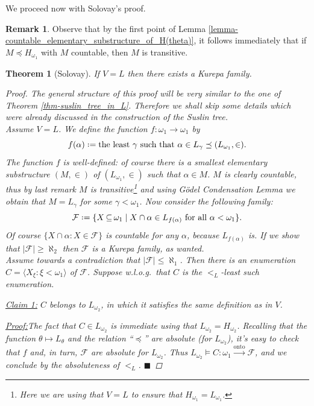 \documentclass[11pt,a4paper]{report}
\newtheorem{theorem}{Theorem}[chapter] %
\theoremstyle{definition}
\newtheorem*{remark}{Remark}
\theoremstyle{num.custom-title}
\theoremstyle{custom-title}
\newenvironment{claim}[1]{\par\noindent\underline{Claim#1:}\space}{} %
\newenvironment{claimproof}[1]{\par\noindent\underline{Proof:}\space#1}{\leavevmode\unskip\penalty9999 \hbox{}\nobreak\hfill\quad\hbox{$\blacksquare$}} %
\DeclareMathOperator{\sse}{\subseteq}
\newcommand{\F}{\mathcal{F}}
\newcommand{\onto}{\xrightarrow{\text{onto}}}
\newcommand*{\defeq}{\mathrel{\rlap{%
                     \raisebox{0.3ex}{$\cdot$}}%
                     \raisebox{-0.3ex}{$\cdot$}}%
                     =}
\begin{document}
We proceed now with Solovay's proof.

\begin{remark}
Observe that by the first point of Lemma \ref{lemma-countable_elementary_substructure_of_H(theta)}, it follows immediately that if $M \preceq H_{\omega_1}$ with $M$ countable, then $M$ is transitive.
\end{remark}

\begin{theorem}[Solovay]\label{thm-kurepa_family_in_L}
If $V=L$ then there exists a Kurepa family.
\begin{proof}
The general structure of this proof will be very similar to the one of Theorem \ref{thm-suslin_tree_in_L}. Therefore we shall skip some details which were already discussed in the construction of the Suslin tree.\\
Assume $V=L$. We define the function $f \colon \omega_1 \to \omega_1$ by
\[
f(\alpha) \defeq \text{the least $\gamma$ such that } \alpha \in L_\gamma \preceq (L_{\omega_1}, \in).
\]
The function $f$ is well-defined: of course there is a smallest elementary substructure $(M,\in)$ of $(L_{\omega_1},\in)$ such that $\alpha \in M$. $M$ is clearly countable, thus by last remark $M$ is transitive\footnote{Here we are using that $V=L$ to ensure that $H_{\omega_1} = L_{\omega_1}$.} and using Gödel Condensation Lemma we obtain that $M=L_\gamma$ for some $\gamma < \omega_1$. Now consider the following family:
\[
\F \defeq \{ X \sse \omega_1 \mid X \cap \alpha \in L_{f(\alpha)} \text{ for all } \alpha < \omega_1 \}.
\]
Of course $\{ X \cap \alpha : X \in \F \}$ is countable for any $\alpha$, because $L_{f(\alpha)}$ is. If we show that $|\F| \geq \aleph_2$ then $\F$ is a Kurepa family, as wanted.\\
Assume towards a contradiction that $|\F| \leq \aleph_1$. Then there is an enumeration $C = \langle X_\xi : \xi < \omega_1 \rangle$ of $\F$. Suppose w.l.o.g.\ that $C$ is the $<_L$-least such enumeration.

\begin{claim}{ 1}
$C$ belongs to $L_{\omega_2}$, in which it satisfies the same definition as in $V$.
\begin{claimproof}
The fact that $C \in L_{\omega_2}$ is immediate using that $L_{\omega_2} = H_{\omega_2}$. Recalling that the function $\theta \mapsto L_\theta$ and the relation ``$\preceq$'' are absolute (for $L_{\omega_2}$), it's easy to check that $f$ and, in turn, $\F$ are absolute for $L_{\omega_2}$. Thus $L_{\omega_2} \models C \colon \omega_1 \onto \F$, and we conclude by the absoluteness of $<_L$.
\end{claimproof}
\end{claim}


\end{proof}
\end{theorem}
\end{document}
